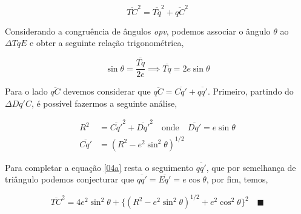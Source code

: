 \documentclass[10pt,a4paper,oneside]{article}
\begin{document}
\begin{equation}
\overline{TC}^{2}=\overline{Tq}^{2}+\overline{qC}^{2}
\label{04a}
\end{equation}

Considerando a congruência de ângulos \textit{opv}, podemos associar o ângulo $\theta$ ao $\Delta TqE$ e obter a seguinte relação trigonométrica,

\begin{equation}
\sin\theta=\frac{\overline{Tq}}{2e} \implies \overline{Tq}=2e\sin\theta
\label{04b}
\end{equation}

Para o lado $\overline{qC}$ devemos considerar que $\overline{qC}=\overline{Cq'}+\overline{qq'}$. Primeiro, partindo do $\Delta Dq'C$, é possível fazermos a seguinte análise,

\begin{equation}
\begin{aligned}
R^{2}&=\overline{Cq'}^{2}+\overline{Dq'}^{2} \quad\mbox{onde}\quad \overline{Dq'}=e\sin\theta\\
\overline{Cq'}&=(R^{2}-e^{2}\sin^{2}\theta)^{1/2}
\end{aligned}
\label{04c}
\end{equation}

Para completar a equação \eqref{04a} resta o seguimento $\overline{qq'}$, que por semelhança de triângulo podemos conjecturar que $\overline{qq'}=\overline{Eq'}=e\cos\theta$, por fim, temos,

\begin{equation}
\overline{TC}^{2}=4e^{2}\sin^{2}\theta+\lbrace(R^{2}-e^{2}\sin^{2}\theta)^{1/2}+e^{2}\cos^{2}\theta\rbrace^{2} \quad\blacksquare
\label{04d}
\end{equation}
\end{document}
